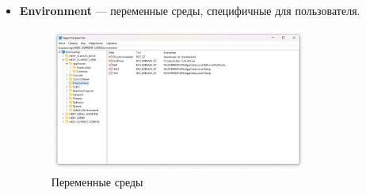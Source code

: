\documentclass[a4paper, 14pt]{report}
\begin{document}
\begin{enumerate}
{\begin{itemize}
{\begin{itemize}
                        \item {\textbf{Environment} — переменные среды, специфичные для пользователя.
                              \begin{figure}[H]
                                  \centering
                                  \includegraphics[width=0.8\textwidth]{../images/HKCU_env.png}
                                  \caption{Переменные среды}
                              \end{figure}
                              }



\end{itemize}}
\end{itemize}}
\end{enumerate}
\end{document}
